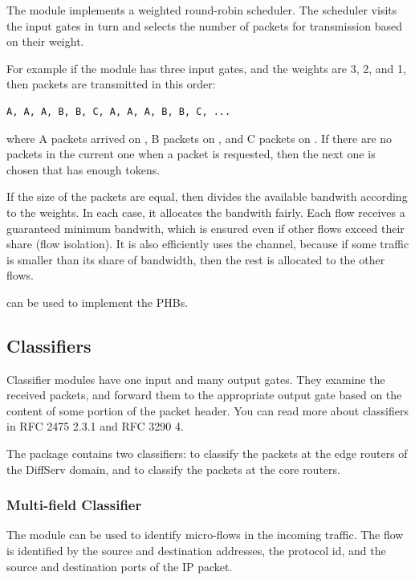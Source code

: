 The  module implements a weighted
round-robin scheduler. The scheduler visits the input gates
in turn and selects the number of packets for transmission
based on their weight.

For example if the module has three input gates, and the weights
are 3, 2, and 1, then packets are transmitted in this order:
\begin{verbatim}
A, A, A, B, B, C, A, A, A, B, B, C, ...
\end{verbatim}
where A packets arrived on , B packets on ,
and C packets on . If there are no packets in the current
one when a packet is requested, then the next one is chosen that has
enough tokens.

If the size of the packets are equal, then 
divides the available bandwith according to the weights. In each
case, it allocates the bandwith fairly. Each flow receives a guaranteed
minimum bandwith, which is ensured even if other flows exceed
their share (flow isolation). It is also efficiently uses the
channel, because if some traffic is smaller than its share of
bandwidth, then the rest is allocated to the other flows.

 can be used to implement the  PHBs.

\subsection{Classifiers}

Classifier modules have one input and many output gates.
They examine the received packets, and forward them to the
appropriate output gate based on the content of some portion
of the packet header. You can read more about classifiers
in RFC 2475 2.3.1 and RFC 3290 4.

The  package contains two
classifiers:  to classify
the packets at the edge routers of the DiffServ domain, and
 to classify the packets
at the core routers.


\subsubsection*{Multi-field Classifier}

The  module can be used to identify
micro-flows in the incoming traffic. The flow is identified
by the source and destination addresses, the protocol id,
and the source and destination ports of the IP packet.

